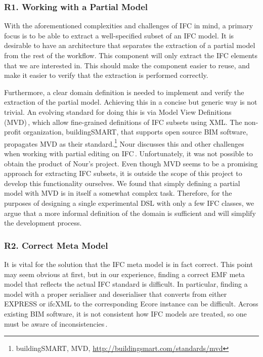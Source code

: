 \subsubsection{R1. Working with a Partial Model}
With the aforementioned complexities and challenges of IFC in mind, a primary focus is to be able to extract a well-specified subset of an IFC model. It is desirable to have an architecture that separates the extraction of a partial model from the rest of the workflow. This component will only extract the IFC elements that we are interested in. This should make the component easier to reuse, and make it easier to verify that the extraction is performed correctly.

Furthermore, a clear domain definition is needed to implement and verify the extraction of the partial model. Achieving this in a concise but generic way is not trivial. An evolving standard for doing this is via Model View Definitions (MVD)\,\cite{nour08}, which allow fine-grained definitions of IFC subsets using XML. The non-profit organization, buildingSMART, that supports open source BIM software, propagates MVD as their standard.\footnote{buildingSMART, MVD, \url{http://buildingsmart.com/standards/mvd}} Nour discusses this and other challenges when working with partial editing on IFC\,\cite{nour08}. Unfortunately, it was not possible to obtain the product of Nour's project. Even though MVD seems to be a promising approach for extracting IFC subsets, it is outside the scope of this project to develop this functionality ourselves. We found that simply defining a partial model with MVD is in itself a somewhat complex task. Therefore, for the purposes of designing a single experimental DSL with only a few IFC classes, we argue that a more informal definition of the domain is sufficient and will simplify the development process.

\subsubsection{R2. Correct Meta Model}
It is vital for the solution that the IFC meta model is in fact correct. This point may seem obvious at first, but in our experience, finding a correct EMF meta model that reflects the actual IFC standard is difficult. In particular, finding a model with a proper serialiser and deserialiser that converts from either EXPRESS or ifcXML to the corresponding Ecore instance can be difficult. Across existing BIM software, it is not consistent how IFC models are treated, so one must be aware of inconsistencies\,\cite[p. 4]{quteprints37725}.

